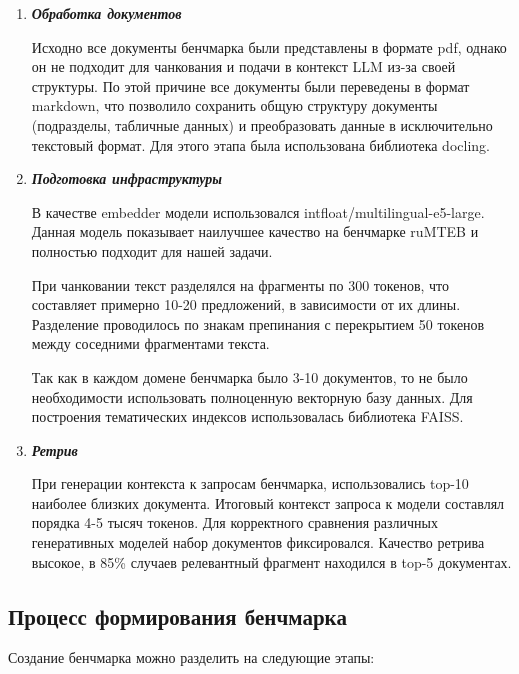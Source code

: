 \begin{enumerate}
  
  \item \textit{\textbf{Обработка документов}}

    Исходно все документы бенчмарка были представлены в формате pdf, однако он не подходит для чанкования и подачи в контекст LLM из-за своей структуры. По этой причине все документы были переведены в формат markdown, что позволило сохранить общую структуру документы (подразделы, табличные данных) и преобразовать данные в исключительно текстовый формат. Для этого этапа была использована библиотека docling.
  
  \item \textit{\textbf{Подготовка инфраструктуры}}

    В качестве embedder модели использовался intfloat/multilingual-e5-large. Данная модель показывает наилучшее качество на бенчмарке ruMTEB и полностью подходит для нашей задачи.

    При чанковании текст разделялся на фрагменты по 300 токенов, что составляет примерно 10-20 предложений, в зависимости от их длины. Разделение проводилось по знакам препинания с перекрытием 50 токенов между соседними фрагментами текста. 

    Так как в каждом домене бенчмарка было 3-10 документов, то не было необходимости использовать полноценную векторную базу данных. Для построения тематических индексов использовалась библиотека FAISS.

  \item \textit{\textbf{Ретрив}}

    При генерации контекста к запросам бенчмарка, использовались top-10 наиболее близких документа. Итоговый контекст запроса к модели составлял порядка 4-5 тысяч токенов. Для корректного сравнения различных генеративных моделей набор документов фиксировался. Качество ретрива высокое, в 85\% случаев релевантный фрагмент находился в top-5 документах.

\end{enumerate}



\subsection{Процесс формирования бенчмарка}
\label{subsec:benchmark_practice} 

Создание бенчмарка можно разделить на следующие этапы:


